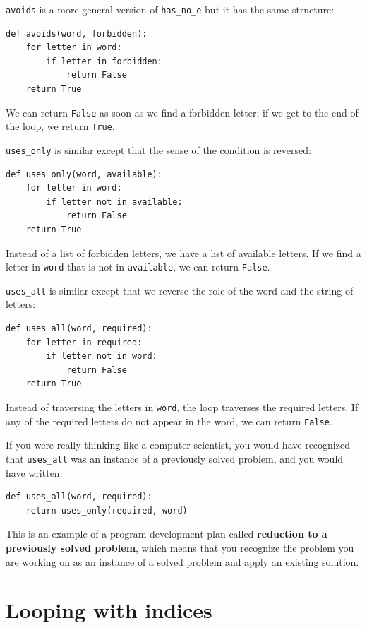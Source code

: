 \documentclass[10pt]{book}
\begin{document}
{\tt avoids} is a more general version of \verb"has_no_e" but it
has the same structure:

\begin{verbatim}
def avoids(word, forbidden):
    for letter in word:
        if letter in forbidden:
            return False
    return True
\end{verbatim}
%
We can return {\tt False} as soon as we find a forbidden letter;
if we get to the end of the loop, we return {\tt True}.

\verb"uses_only" is similar except that the sense of the condition
is reversed:

\begin{verbatim}
def uses_only(word, available):
    for letter in word: 
        if letter not in available:
            return False
    return True
\end{verbatim}
%
Instead of a list of forbidden letters, we have a list of available
letters.  If we find a letter in {\tt word} that is not in
{\tt available}, we can return {\tt False}.

\verb"uses_all" is similar except that we reverse the role
of the word and the string of letters:

\begin{verbatim}
def uses_all(word, required):
    for letter in required: 
        if letter not in word:
            return False
    return True
\end{verbatim}
%
Instead of traversing the letters in {\tt word}, the loop
traverses the required letters.  If any of the required letters
do not appear in the word, we can return {\tt False}.

If you were really thinking like a computer scientist, you would
have recognized that \verb"uses_all" was an instance of a
previously solved problem, and you would have written:

\begin{verbatim}
def uses_all(word, required):
    return uses_only(required, word)
\end{verbatim}
%
This is an example of a program development plan called {\bf
  reduction to a previously solved problem}, which means that you
recognize the problem you are working on as an instance of a solved
problem and apply an existing solution.   


\section{Looping with indices}
\end{document}

